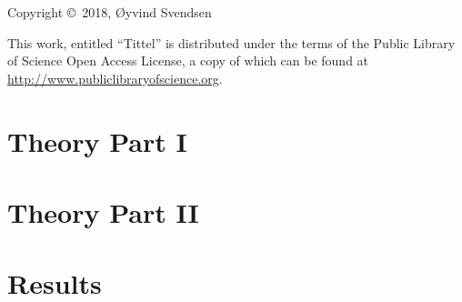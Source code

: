 \documentclass[a4, 12pt, draft]{book}
\title{\mintittel}
\author{\O yvind Svendsen}
\date{01.06.18}
\newcommand{\mintittel}{Tittel}
\begin{document}

\vspace*{18cm}
\noindent Copyright \copyright$\,$ 2018, \O yvind Svendsen
\vspace{4mm}

\noindent This work, entitled ``\mintittel'' is distributed under the
terms of the Public Library of Science Open Access License, a copy of which can be found at \url{http://www.publiclibraryofscience.org}. 

%
%



\chapter{Theory Part I  }





\chapter{Theory Part II }





\chapter{Results}






\end{document}
